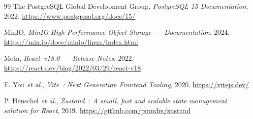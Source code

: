 \documentclass[a4paper,12pt,oneside]{report}
\begin{document}
\begin{thebibliography}{99}
		The PostgreSQL Global Development Group, \textit{PostgreSQL 15 Documentation}, 2022.
		\url{https://www.postgresql.org/docs/15/}
		
		MinIO, \textit{MinIO High Performance Object Storage~--- Documentation}, 2024.
		\url{https://min.io/docs/minio/linux/index.html}
		
		Meta, \textit{React~v18.0~--- Release Notes}, 2022.
		\url{https://react.dev/blog/2022/03/29/react-v18}
		
		E. You \textit{et al.}, \textit{Vite~: Next Generation Frontend Tooling}, 2020.
		\url{https://vitejs.dev/}
		
		P. Henschel \textit{et al.}, \textit{Zustand~: A small, fast and scalable state management
			solution for React}, 2019.
		\url{https://github.com/pmndrs/zustand}
		
	\end{thebibliography}
	
\end{document}
